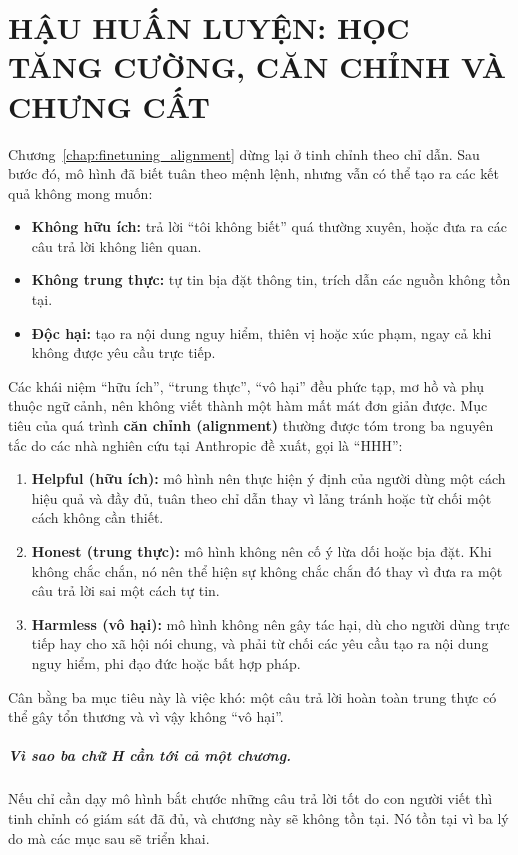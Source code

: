 
\chapter{HẬU HUẤN LUYỆN: HỌC TĂNG CƯỜNG, CĂN CHỈNH VÀ CHƯNG CẤT}
\label{chap:post_training}

Chương~\ref{chap:finetuning_alignment} dừng lại ở tinh chỉnh theo chỉ dẫn. Sau bước đó, mô hình đã biết tuân theo mệnh lệnh, nhưng vẫn có thể tạo ra các kết quả không mong muốn:
\begin{itemize}
    \item \textbf{Không hữu ích:} trả lời “tôi không biết” quá thường xuyên, hoặc đưa ra các câu trả lời không liên quan.
    \item \textbf{Không trung thực:} tự tin bịa đặt thông tin, trích dẫn các nguồn không tồn tại.
    \item \textbf{Độc hại:} tạo ra nội dung nguy hiểm, thiên vị hoặc xúc phạm, ngay cả khi không được yêu cầu trực tiếp.
\end{itemize}

Các khái niệm “hữu ích”, “trung thực”, “vô hại” đều phức tạp, mơ hồ và phụ thuộc ngữ cảnh, nên không viết thành một hàm mất mát đơn giản được. Mục tiêu của quá trình \textbf{căn chỉnh (alignment)} thường được tóm trong ba nguyên tắc do các nhà nghiên cứu tại Anthropic đề xuất, gọi là “HHH”:
\begin{enumerate}
    \item \textbf{Helpful (hữu ích):} mô hình nên thực hiện ý định của người dùng một cách hiệu quả và đầy đủ, tuân theo chỉ dẫn thay vì lảng tránh hoặc từ chối một cách không cần thiết.
    \item \textbf{Honest (trung thực):} mô hình không nên cố ý lừa dối hoặc bịa đặt. Khi không chắc chắn, nó nên thể hiện sự không chắc chắn đó thay vì đưa ra một câu trả lời sai một cách tự tin.
    \item \textbf{Harmless (vô hại):} mô hình không nên gây tác hại, dù cho người dùng trực tiếp hay cho xã hội nói chung, và phải từ chối các yêu cầu tạo ra nội dung nguy hiểm, phi đạo đức hoặc bất hợp pháp.
\end{enumerate}
Cân bằng ba mục tiêu này là việc khó: một câu trả lời hoàn toàn trung thực có thể gây tổn thương và vì vậy không “vô hại”.

\paragraph{Vì sao ba chữ H cần tới cả một chương.} Nếu chỉ cần dạy mô hình bắt chước những câu trả lời tốt do con người viết thì tinh chỉnh có giám sát đã đủ, và chương này sẽ không tồn tại. Nó tồn tại vì ba lý do mà các mục sau sẽ triển khai.

